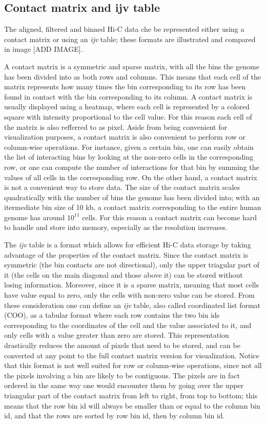 \subsection{Contact matrix and ijv table}

The aligned, filtered and binned Hi-C data che be represented either using a contact matrix or using an \emph{ijv} table; these formats are illustrated and compared in image [ADD IMAGE].

A contact matrix is a symmetric and sparse matrix, with all the bins the genome has been divided into as both rows and columns. This means that each cell of the matrix represents how many times the bin corresponding to its row has been found in contact with the bin corresponding to its column. A contact matrix is usually displayed using a heatmap, where each cell is represented by a colored square with intensity proportional to the cell value. For this reason each cell of the matrix is also refferred to as pixel. Aside from being convenient for visualization purposes, a contact matrix is also convenient to perform row or column-wise operations. For instance, given a certain bin, one can easily obtain the list of interacting bins by looking at the non-zero cells in the corresponding row, or one can compute the number of interactions for that bin by summing the values of all cells in the corresponding row. On the other hand, a contact matrix is not a convenient way to store data. The size of the contact matrix scales quadratically with the number of bins the genome has been divided into; with an itermediate bin size of 10 kb, a contact matrix corresponding to the entire human genome has around $10^{11}$ cells. For this reason a contact matrix can become hard to handle and store into memory, especially as the resolution increases.

The \emph{ijv} table is a format which allows for efficient Hi-C data storage by taking advantage of the properties of the contact matrix. Since the contact matrix is symmetric (the bin contacts are not directional), only the upper triagular part of it (the cells on the main diagonal and those above it) can be stored without losing information. Moreover, since it is a sparse matrix, meaning that most cells have value equal to zero, only the cells with non-zero value can be stored. From these consideration one can define an \emph{ijv} table, also called coordinated list format (COO), as a tabular format where each row contains the two bin ids corresponding to the coordinates of the cell and the value associated to it, and only cells with a value greater than zero are stored. This representation drastically reduces the amount of pixels that need to be stored, and can be converted at any point to the full contact matrix version for visualization. Notice that this format is not well suited for row or column-wise operations, since not all the pixels involving a bin are likely to be contiguous. The pixels are in fact ordered in the same way one would encounter them by going over the upper triangular part of the contact matrix from left to right, from top to bottom; this means that the row bin id will always be smaller than or equal to the column bin id, and that the rows are sorted by row bin id, then by column bin id.

